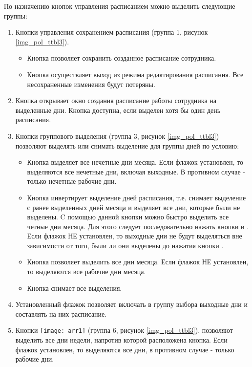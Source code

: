 По назначению кнопок управления расписанием можно выделить следующие группы:
\begin{enumerate}
 \item Кнопки управления сохранением расписания (группа 1, рисунок \ref{img_pol_ttbl3}). 
 \begin{itemize}
  \item Кнопка  позволяет сохранить созданное расписание сотрудника.
  \item Кнопка  осуществляет выход из режима редактирования расписания. Все несохраненные изменения будут потеряны.
 \end{itemize}
 \item Кнопка  открывает окно создания расписание работы сотрудника на выделенные дни. Кнопка доступна, если выделен хотя бы один день расписания.
 \item Кнопки группового выделения (группа 3, рисунок \ref{img_pol_ttbl3}) позволяют выделять или снимать выделение для группы дней по условию:
 \begin{itemize}
  \item Кнопка  выделяет все нечетные дни месяца. Если флажок  установлен, то выделяются все нечетные дни, включая выходные. В противном случае - только нечетные рабочие дни.
 \item Кнопка  инвертирует выделение дней расписания, т.е. снимает выделение с ранее выделенных дней месяца и выделяет все дни, которые были не выделены. C помощью данной кнопки можно быстро выделить все четные дни месяца. Для этого следует последовательно нажать кнопки  и . Если флажок  НЕ установлен, то выходные дни не будут выделяться вне зависимости от того, были ли они выделены до нажатия кнопки .
 \item Кнопка  позволяет выделить все дни месяца. Если флажок  НЕ установлен, то выделяются все рабочие дни месяца.
 \item Кнопка  снимает все выделения.
 \end{itemize}
 \item Установленный флажок  позволяет включать в группу выбора выходные дни и составлять на них расписание.
 \item Кнопки \texttt{[image: arr1]} (группа 6, рисунок \ref{img_pol_ttbl3}),   позволяют выделить все дни недели, напротив которой расположена кнопка. Если флажок  установлен, то выделяются все дни, в противном случае - только рабочие дни.
\end{enumerate}

